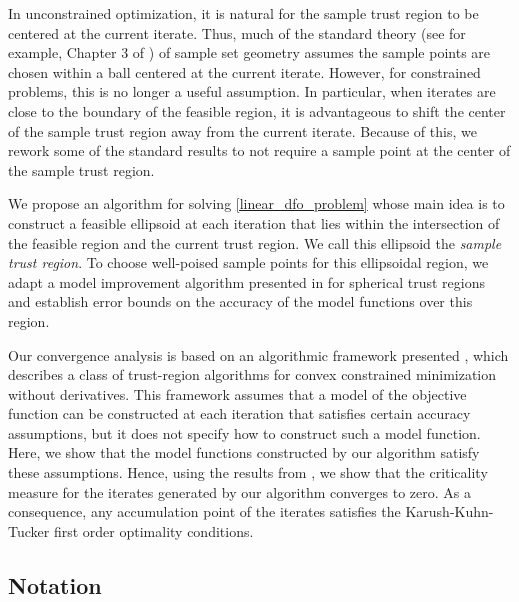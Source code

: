 \documentclass{article}
\begin{document}
In unconstrained optimization, it is natural for the sample trust region to be centered at the current iterate.
Thus, much of the standard theory (see for example, Chapter 3 of \cite{introduction_book})
of sample set geometry assumes the sample points are chosen within a ball centered at the current iterate.
However, for constrained problems,  this is no longer a useful assumption.
In particular, when iterates are close to the boundary of the feasible region, it is advantageous to shift the center of the sample trust region away from the current iterate.
Because of this, we rework some of the standard results to not require a sample point at the center of the sample trust region.


We propose an algorithm for solving \cref{linear_dfo_problem} whose main idea is to construct a feasible ellipsoid at each iteration that lies within the intersection of the feasible region and the current trust region.   We call this ellipsoid the {\em sample trust region}.
To choose well-poised sample points for this ellipsoidal region,  we adapt a model improvement algorithm presented in \cite{introduction_book} for spherical trust regions and establish error bounds on the accuracy of the model functions over this region.    

Our convergence analysis is based on an algorithmic framework presented \cite{Conejo:2013:GCT:2620806.2621814},  which describes a class of trust-region algorithms for convex constrained minimization without derivatives.   This framework assumes that a model of the objective function can be constructed at each iteration that satisfies certain accuracy assumptions, but it does not specify how to construct such a model function.    Here, we show that the model functions constructed by our algorithm satisfy these assumptions.  Hence,  using the results from \cite{Conejo:2013:GCT:2620806.2621814}, we show that
the criticality measure for the iterates generated by our algorithm converges to zero.  As a consequence, any accumulation point of the iterates satisfies the Karush-Kuhn-Tucker first order optimality conditions.  


\subsection{Notation}
\end{document}
